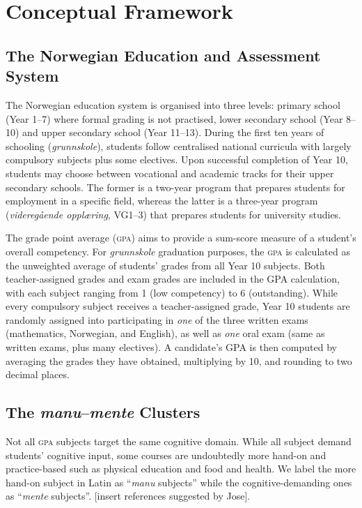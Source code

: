 \section{Conceptual Framework}

\subsection{The Norwegian Education and Assessment System}

The Norwegian education system is organised into three levels: primary school (Year 1--7) where formal grading is not practised, lower secondary school (Year 8--10) and upper secondary school (Year 11--13). During the first ten years of schooling (\textit{grunnskole}), students follow centralised national curricula with largely compulsory subjects plus some electives. Upon successful completion of Year 10, students may choose between vocational and academic tracks for their upper secondary schools. The former is a two-year program that prepares students for employment in a specific field, whereas the latter is a three-year program (\textit{videreg{\aa}ende oppl{\ae}ring}, VG1--3) that prepares students for university studies.

The grade point average (\textsc{gpa}) aims to provide a sum-score measure of a student's overall competency. For \textit{grunnskole} graduation purposes, the \textsc{gpa} is calculated as the unweighted average of students' grades from all Year 10 subjects. Both teacher-assigned grades and exam grades are included in the GPA calculation, with each subject ranging from 1 (low competency) to 6 (outstanding). While every compulsory subject receives a teacher-assigned grade, Year 10 students are randomly assigned into participating in \emph{one} of the three written exams (mathematics, Norwegian, and English), as well as \emph{one} oral exam (same as written exams, plus many electives). A candidate's GPA is then computed by averaging the grades they have obtained, multiplying by 10, and rounding to two decimal places.

\subsection{The \textit{manu}--\textit{mente} Clusters}

Not all \textsc{gpa} subjects target the same cognitive domain. While all subject demand students' cognitive input, some courses are undoubtedly more hand-on and practice-based such as physical education and food and health. We label the more hand-on subject in Latin as ``\textit{manu} subjects'' while the cognitive-demanding ones as ``\textit{mente} subjects''. [insert references suggested by Jose].